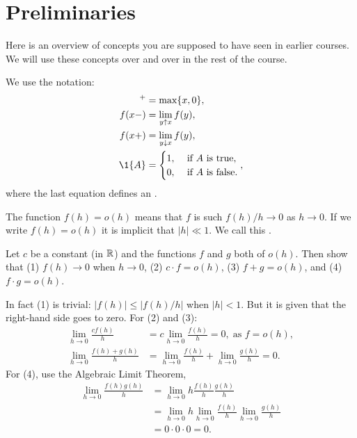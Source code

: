 \section{Preliminaries}
\label{sec:preliminaries}




Here is an overview of concepts you are supposed to have seen in earlier courses.
We will use these concepts over and over in the rest of the course.


We use the notation:
  \begin{align*}
  [x]^+ &= \max\{x, 0\}, \\
  f(x-) &= \lim_{y\uparrow x} f(y),\\
  f(x+) &= \lim_{y\downarrow x} f(y),\\
    \1{A} &=
            \begin{cases}
              1, & \text{ if $A$ is true}, \\
              0, & \text{ if $A$ is false}.
            \end{cases}, 
\end{align*}
where the last equation defines an .


The function $f(h)=o(h)$ means that $f$ is such $f(h)/h \to 0$ as $h\to 0$.
If we write $f(h) = o(h)$ it is implicit that $|h| \ll 1$.
We call this .
\begin{exercise}%
  Let $c$ be a constant (in $\mathbb{R}$) and the functions $f$ and $g$ both of $o(h)$. Then show that (1) $f(h) \to 0$ when $h\to 0$, (2) $c\cdot f = o(h)$, (3) $f+g=o(h)$, and (4) $f\cdot g=o(h)$. 
\begin{solution}
     In fact (1) is trivial: $|f(h)| \leq |f(h)/h|$ when $|h| < 1$.
     But it is given that the right-hand side goes to zero.
     For (2) and (3):
\begin{align*}
\lim_{h\to 0} \frac{c f(h)}{h} &=  c \lim_{h\to 0} \frac{f(h)}{h} = 0, \; \text{as } f = o(h), \\
\lim_{h\to 0} \frac{f(h) + g(h)} h &= \lim_{h\to 0} \frac{f(h)} h + \lim_{h\to 0} \frac{g(h)} h = 0.
\end{align*}
For (4), use  the Algebraic Limit Theorem,
\begin{align*}
\lim_{h\to 0} \frac{f(h)g(h)}{h} &= \lim_{h\to 0} h \frac{f(h)}{h} \frac{g(h)}{h} \\
&= \lim_{h\to 0} h \lim_{h\to 0} \frac{f(h)}{h} \lim_{h\to 0} \frac{g(h)}{h} \\
&= 0 \cdot 0 \cdot 0 = 0.
\end{align*}
\end{solution}
\end{exercise}


